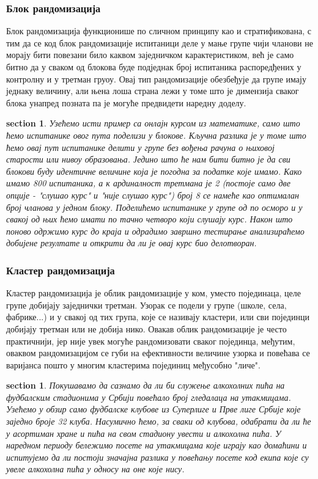 \documentclass[12pt, a4paper]{article}
\newtheorem{primer}[Пример]{section}
\begin{document}
\subsubsection{Блок рандомизација}

Блок рандомизација функционише по сличном принципу као и стратификована, с тим да се код блок 
рандомизације испитаници деле у мање групе чији чланови не морају бити повезани било каквом 
заједничком карактеристиком, већ је само битно да у сваком од блокова буде подједнак број 
испитаника распоредђених у контролну и у третман груоу. Овај тип рандомизације обезбеђује да групе 
имају једнаку величину, али њена лоша страна лежи у томе што је димензија сваког блока унапред 
позната па је могуће предвидети наредну доделу. 

\begin{primer}
Узећемо исти пример са онлајн курсом из математике, само што ћемо испитанике овог пута поделизи у 
блокове. Кључна разлика је у томе што ћемо овај пут испитанике делити у групе без вођења рачуна о 
њиховој старости или нивоу образовања. Једино што ће нам бити битно је да сви блокови буду 
идентичне величине која је погодна за податке које имамо. Како имамо 800 испитаника, а к
ардиналност третмана је 2 (постоје само две опције - \textit{"слушао курс"} и 
\textit{"није слушао курс"}) број 8 се намеће као оптималан број чланова у једном блоку. 
Поделићемо испитанике у групе од по осморо и у свакој од њих ћемо имати по тачно четворо који 
слушају курс. Након што поново одржимо курс до краја и одрадимо завршно тестирање 
анализираћемо добијене резултате и открити да ли је овај курс био делотворан.
\end{primer}

\subsubsection{Кластер рандомизација}

Кластер рандомизација је облик рандомизације у ком, уместо појединаца, целе групе добијају 
заједнички третман. Узорак се подели у групе (школе, села, фабрике...) и у свакој од тих група, 
које се називају кластери, или сви појединци добијају третман или не добија нико.
Овакав облик рандомизације је често практичнији, јер није увек могуће рандомизовати сваког 
појединца, међутим, оваквом рандомизацијом се губи на ефективности величине узорка и повећава се 
варијанса пошто у многим кластерима појединиц међусобно "личе". 

\begin{primer}
Покушавамо да сазнамо да ли би служење алкохолних пића на фудбалским стадионима у Србији повећало 
број гледалаца на утакмицама. Узећемо у обзир само фудбалске клубове из Суперлиге и Прве лиге Србије 
које заједно броје 32 клуба. Насумично ћемо, за сваки од клубова, одабрати да ли ће у асортиман 
хране и пића на свом стадиону увести и алкохолна пића. У наредном периоду бележимо посете на утакмицама 
које играју као домаћини и испитујемо да ли постоји значајна разлика у повећању посете код екипа 
које су увеле алкохолна пића у односу на оне које нису.
\end{primer}
\end{document}
